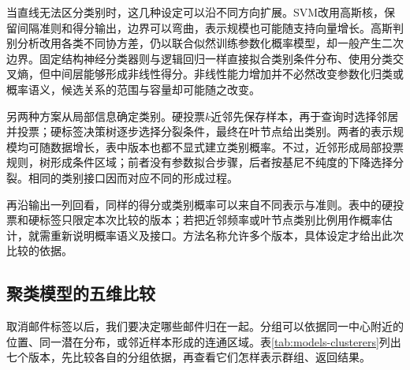 当直线无法区分类别时，这几种设定可以沿不同方向扩展。SVM改用高斯核，保留间隔准则和得分输出，边界可以弯曲，表示规模也可能随支持向量增长。高斯判别分析改用各类不同协方差，仍以联合似然训练参数化概率模型，却一般产生二次边界。固定结构神经分类器则与逻辑回归一样直接拟合类别条件分布、使用分类交叉熵，但中间层能够形成非线性得分。非线性能力增加并不必然改变参数化归类或概率语义，候选关系的范围与容量却可能随之改变。

另两种方案从局部信息确定类别。硬投票$k$近邻先保存样本，再于查询时选择邻居并投票；硬标签决策树逐步选择分裂条件，最终在叶节点给出类别。两者的表示规模均可随数据增长，表中版本也都不显式建立类别概率。不过，近邻形成局部投票规则，树形成条件区域；前者没有参数拟合步骤，后者按基尼不纯度的下降选择分裂。相同的类别接口因而对应不同的形成过程。

再沿输出一列回看，同样的得分或类别概率可以来自不同表示与准则。表中的硬投票和硬标签只限定本次比较的版本；若把近邻频率或叶节点类别比例用作概率估计，就需重新说明概率语义及接口。方法名称允许多个版本，具体设定才给出此次比较的依据。

\FloatBarrier
\subsection{聚类模型的五维比较}
\label{sec:models-clustering-grid}

取消邮件标签以后，我们要决定哪些邮件归在一起。分组可以依据同一中心附近的位置、同一潜在分布，或邻近样本形成的连通区域。表\ref{tab:models-clusterers}列出七个版本，先比较各自的分组依据，再查看它们怎样表示群组、返回结果。

